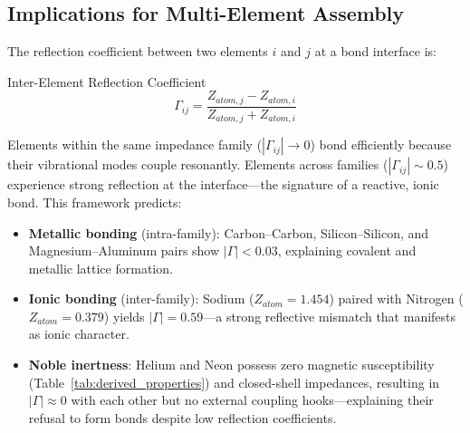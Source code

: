 \subsection{Implications for Multi-Element Assembly}

The reflection coefficient between two elements $i$ and $j$ at a bond interface is:
\begin{resultbox}{Inter-Element Reflection Coefficient}
\begin{equation}
    \Gamma_{ij} = \frac{Z_{atom,j} - Z_{atom,i}}{Z_{atom,j} + Z_{atom,i}}
    \label{eq:gamma_inter}
\end{equation}
\end{resultbox}

Elements within the same impedance family ($|\Gamma_{ij}| \to 0$) bond efficiently because their vibrational modes couple resonantly. Elements across families ($|\Gamma_{ij}| \sim 0.5$) experience strong reflection at the interface---the signature of a reactive, ionic bond. This framework predicts:
\begin{itemize}
    \item \textbf{Metallic bonding} (intra-family): Carbon--Carbon, Silicon--Silicon, and Magnesium--Aluminum pairs show $|\Gamma| < 0.03$, explaining covalent and metallic lattice formation.
    \item \textbf{Ionic bonding} (inter-family): Sodium ($Z_{atom} = 1.454$) paired with Nitrogen ($Z_{atom} = 0.379$) yields $|\Gamma| = 0.59$---a strong reflective mismatch that manifests as ionic character.
    \item \textbf{Noble inertness}: Helium and Neon possess zero magnetic susceptibility (Table~\ref{tab:derived_properties}) and closed-shell impedances, resulting in $|\Gamma| \approx 0$ with each other but no external coupling hooks---explaining their refusal to form bonds despite low reflection coefficients.
\end{itemize}